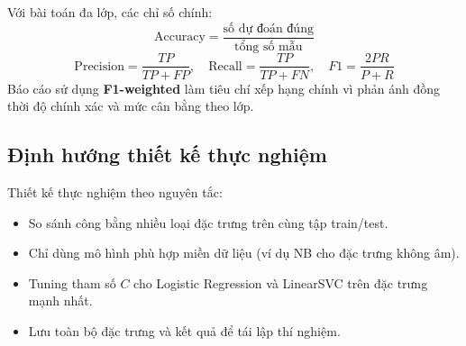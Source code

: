 Với bài toán đa lớp, các chỉ số chính:
\begin{equation}
\mathrm{Accuracy} = \frac{\text{số dự đoán đúng}}{\text{tổng số mẫu}}
\end{equation}
\begin{equation}
\mathrm{Precision} = \frac{TP}{TP+FP},\quad
\mathrm{Recall} = \frac{TP}{TP+FN},\quad
F1 = \frac{2PR}{P+R}
\end{equation}
Báo cáo sử dụng \textbf{F1-weighted} làm tiêu chí xếp hạng chính vì phản ánh đồng thời độ chính xác và mức cân bằng theo lớp.

\subsection{Định hướng thiết kế thực nghiệm}
Thiết kế thực nghiệm theo nguyên tắc:
\begin{itemize}[nosep]
    \item So sánh công bằng nhiều loại đặc trưng trên cùng tập train/test.
    \item Chỉ dùng mô hình phù hợp miền dữ liệu (ví dụ NB cho đặc trưng không âm).
    \item Tuning tham số $C$ cho Logistic Regression và LinearSVC trên đặc trưng mạnh nhất.
    \item Lưu toàn bộ đặc trưng và kết quả để tái lập thí nghiệm.
\end{itemize}
